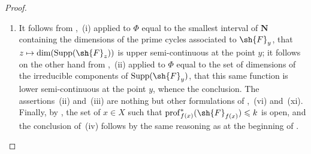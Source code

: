 \begin{proof}
\begin{enumerate}[label=(\roman*)]
  \item It follows from ,~(i) applied to $\Phi$ equal to the smallest interval of $\mathbf{N}$ containing the dimensions of the prime cycles associated to $\sh{F}_y$, that $z\mapsto\dim(\operatorname{Supp}(\sh{F}_z))$ is upper semi-continuous at the point $y$; it follows on the other hand from ,~(ii) applied to $\Phi$ equal to the set of dimensions of the irreducible components of $\operatorname{Supp}(\sh{F}_y)$, that this same function is lower semi-continuous at the point $y$, whence the conclusion.
The assertions~(ii) and~(iii) are nothing but other formulations of ,~(vi) and~(xi).
Finally, by , the set of $x\in X$ such that $\operatorname{prof}_{f(x)}^*(\sh{F}_{f(x)})\leqslant k$ is open, and the conclusion of~(iv) follows by the same reasoning as at the beginning of .
\end{enumerate}
\end{proof}


